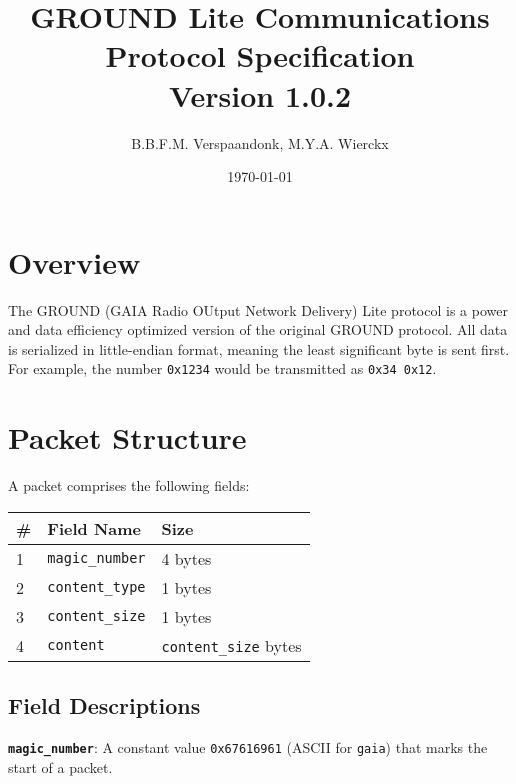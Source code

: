 \documentclass[a4paper]{article}
\title{GROUND Lite Communications Protocol Specification\\ \large Version 1.0.2}
\date{\today}
\author{B.B.F.M. Verspaandonk, M.Y.A. Wierckx}
\begin{document}
\maketitle

\tableofcontents

\section{Overview}
The GROUND (GAIA Radio OUtput Network Delivery) Lite protocol is a power and data efficiency optimized version of the original GROUND protocol. All data is serialized in little-endian format, meaning the least significant byte is sent first. For example, the number \texttt{0x1234} would be transmitted as \texttt{0x34 0x12}.

\section{Packet Structure}
A packet comprises the following fields:
\begin{longtable}{@{}lll@{}}
\toprule
\# & Field Name             & Size                         \\
\midrule
1  & \texttt{magic\_number} & 4 bytes                      \\
2  & \texttt{content\_type} & 1 bytes                      \\
3  & \texttt{content\_size} & 1 bytes                      \\
4  & \texttt{content}       & \texttt{content\_size} bytes \\
\bottomrule
\end{longtable}

\subsection{Field Descriptions}
\textbf{\texttt{magic\_number}}: A constant value \texttt{0x67616961} (ASCII for \texttt{gaia}) that marks the start of a packet.
\end{document}

